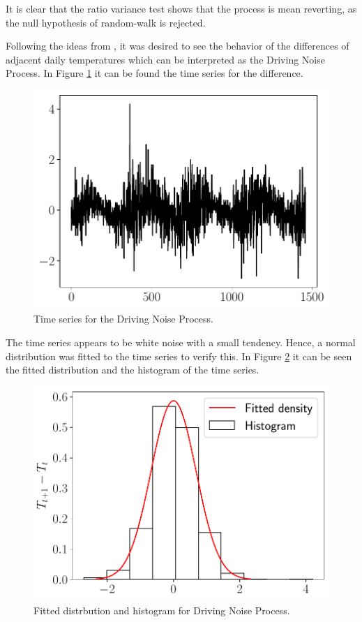 \documentclass[11pt]{article}
\theoremstyle{definition}
\theoremstyle{remark}
\theoremstyle{remark}
\begin{document}
It is clear that the ratio variance test shows that the process is
mean reverting, as the null hypothesis of random-walk is rejected.

Following the ideas from \parencite{alaton2002}, it was desired to see
the behavior of the differences of adjacent daily temperatures which
can be interpreted as the Driving Noise Process. In Figure
\ref{fig:diff} it can be found the time series for the difference.

\begin{figure}[H]
  \centering
  \includegraphics[scale=.5]{diffs_temps.pdf}
  \caption{Time series for the Driving Noise Process.}
  \label{fig:diff}
\end{figure}

The time series appears to be white noise with a small tendency. Hence, a normal
distribution was fitted to the time series to verify this. In Figure
\ref{fig:wn} it can be seen the fitted distribution and the histogram
of the time series.

\begin{figure}[H]
  \centering
  \includegraphics[scale=.5]{hist_diffs_temps.pdf}
  \caption{Fitted distrbution and histogram for Driving Noise Process.}
  \label{fig:wn}
\end{figure}
\end{document}
